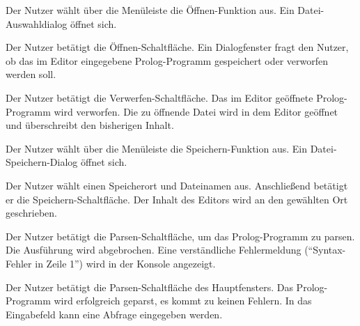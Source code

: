 \documentclass[parskip=full,11pt,twoside]{scrartcl}
\begin{document}

{Der Nutzer wählt über die Menüleiste die Öffnen-Funktion aus.}
{Ein Datei-Auswahldialog öffnet sich.}

{Der Nutzer betätigt die Öffnen-Schaltfläche.}
{Ein Dialogfenster fragt den Nutzer, ob das im Editor eingegebene Prolog-Programm gespeichert oder verworfen werden soll.}

{Der Nutzer betätigt die Verwerfen-Schaltfläche.}
{Das im Editor geöffnete Prolog-Programm wird verworfen. Die zu öffnende Datei wird in dem Editor geöffnet und überschreibt den bisherigen Inhalt.}


{Der Nutzer wählt über die Menüleiste die Speichern-Funktion aus.}
{Ein Datei-Speichern-Dialog öffnet sich.}

{Der Nutzer wählt einen Speicherort und Dateinamen aus. Anschließend betätigt er die Speichern-Schaltfläche.}
{Der Inhalt des Editors wird an den gewählten Ort geschrieben.}


{Der Nutzer betätigt die Parsen-Schaltfläche, um das Prolog-Programm zu parsen.}
{Die Ausführung wird abgebrochen. Eine verständliche Fehlermeldung (``Syntax-Fehler in Zeile 1'') wird in der Konsole angezeigt.}


{Der Nutzer betätigt die Parsen-Schaltfläche des Hauptfensters.}
{Das Prolog-Programm wird erfolgreich geparst, es kommt zu keinen Fehlern. In das Eingabefeld kann eine Abfrage eingegeben werden.}
\end{document}

